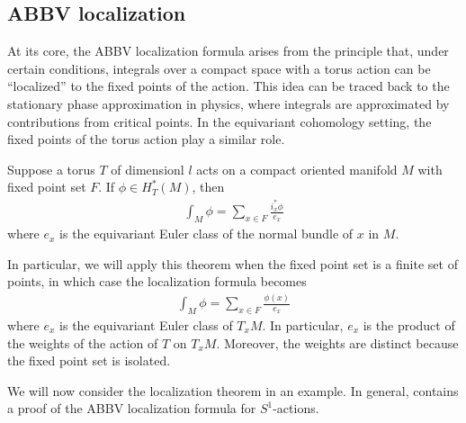 \subsection{ABBV localization}
At its core, the ABBV localization formula arises from the principle that,
under certain conditions, integrals over a compact space with a torus action can be “localized”
to the fixed points of the action. This idea can be traced back to the stationary
phase approximation in physics, where integrals are approximated by contributions
from critical points. In the equivariant cohomology setting, the fixed points of the torus action play a similar role.
\begin{theorem}
	 Suppose a torus $T$ of dimensionl $l$ acts on a
	compact oriented manifold $M$ with fixed point set $F$. If $\phi \in H^*_T(M)$, then
	\begin{align*}
		\int_M \phi = \sum_{x\in F} \frac{i^*_x\phi}{e_x}
	\end{align*} where $e_x$ is the equivariant Euler class of the normal bundle of $x$ in $M$.
\end{theorem}
In particular, we will apply this theorem when the fixed point set is a finite set of points,
in which case the localization formula becomes \begin{align*}
	\int_M \phi = \sum_{x\in F} \frac{\phi(x)}{e_x}
\end{align*} where $e_x$ is the equivariant Euler class of $T_xM$. In particular, $e_x$
is the product of the weights of the action of $T$ on $T_xM$. Moreover, the weights are
distinct because the fixed point set is isolated.

\hfill 

We will now consider the localization theorem in an example.
In general, \cite{tu} contains a proof of the ABBV localization formula 
for $S^1$-actions.

